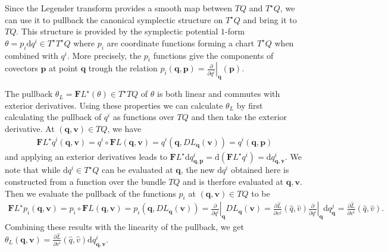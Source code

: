 \documentclass[10pt, a4paper]{article}
\begin{document}
{\begin{enumerate}
  Since the Legender transform provides a smooth map between $TQ$ and $T^\star Q$, we can use it to pullback the canonical symplectic structure on $T^\star Q$ and bring it to $TQ$. This structure is provided by the symplectic potential $1$-form $\theta = p_i \text{d}q^i \in T^\star T^\star Q$ where $p_i$ are coordinate functions forming a chart $T^\star Q$ when combined with $q^i$. More precisely, the $p_i$ functions give the components of covectors $\mathbf{p}$ at point $\mathbf{q}$ trough the relation $p_{i}(\mathbf{q}, \mathbf{p}) = \left.\frac{\partial}{\partial q^i}\right|_\mathbf{q} (\mathbf{p})$.\medskip
  
  The pullback $\theta_L = \mathbf{F}L^{\star}(\theta) \in T^{\star} TQ$ of $\theta$ is both linear and commutes with exterior derivatives. Using these properties we can calculate $\theta_L$ by first calculating the pullback of $q^i$ as functions over $TQ$ and then take the exterior derivative. At $(\mathbf{q}, \mathbf{v}) \in TQ$, we have 
  \begin{align*}
    \mathbf{F}L^{\star} q^i (\mathbf{q}, \mathbf{v}) = q^i \circ \mathbf{F}L (\mathbf{q}, \mathbf{v}) =  q^i(\mathbf{q}, DL_\mathbf{q}(\mathbf{v})) = q^i(\mathbf{q}, \mathbf{p})
  \end{align*}
  and applying an exterior derivatives leads to $\mathbf{F}L^{\star} \text{d} q^i_{\mathbf{q}, \mathbf{p}} = \text{d}(\mathbf{F}L^{\star} q^i) = \text{d}q^i_{\mathbf{q}, \mathbf{v}}$. We note that while $\text{d}q^i\in T^{\star}Q$ can be evaluated at $\mathbf{q}$, the new $\text{d}q^i$ obtained here is constructed from a function over the bundle $TQ$ and is therfore evaluated at $\mathbf{q}, \mathbf{v}$. Then we evaluate the pullback of the functions $p_{i}$ at $(\mathbf{q}, \mathbf{v}) \in TQ$ to be
  \begin{align*}
    \mathbf{F}L^{\star} p_i(\mathbf{q}, \mathbf{v}) = p_i \circ \mathbf{F}L (\mathbf{q}, \mathbf{v}) =  p_i (\mathbf{q}, DL_\mathbf{q}(\mathbf{v})) =  \left.\frac{\partial}{\partial q^i}\right|_\mathbf{q} DL_\mathbf{q}(\mathbf{v}) = \frac{\partial \hat{L}}{\partial v^j} (\hat{q}, \hat{v}) \left.\frac{\partial}{\partial q^i}\right|_\mathbf{q} \text{d}q^{j}_{\mathbf{q}} = \frac{\partial \hat{L}}{\partial v^i} (\hat{q}, \hat{v}).
  \end{align*}
  Combining these results with the linearity of the pullback, we get $\theta_L(\mathbf{q}, \mathbf{v}) = \frac{\partial \hat{L}}{\partial v^i} (\hat{q}, \hat{v}) \text{d}q^{i}_{\mathbf{q}, \mathbf{v}}$. 

\end{enumerate}}
\end{document}
